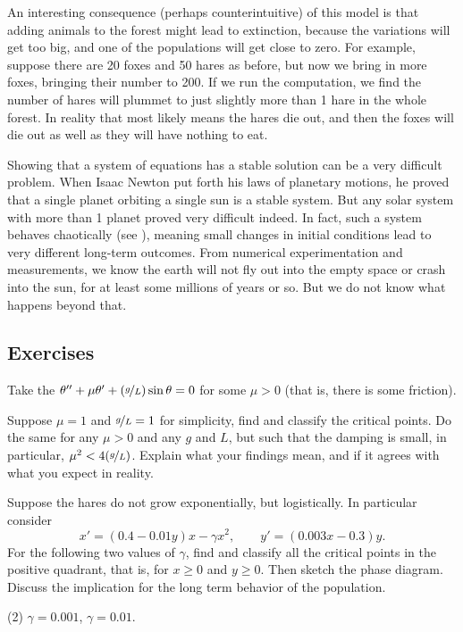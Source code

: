 An interesting consequence (perhaps counterintuitive) of this model is that adding animals to
the forest might lead to extinction, because the variations will get too
big, and one of the populations will get close to zero.  For example, suppose there are 20 foxes and 50 hares as
before, but now we bring in more foxes, bringing their number to 200.  If we
run the computation, we find the number of hares will plummet to just
slightly more than 1 hare in the whole forest.  In reality that most
likely means the hares die out, and then the foxes will die out as well
as they will have nothing to eat.

Showing that a system of equations has a stable solution can be a very
difficult problem.  When Isaac Newton put forth his laws of
planetary motions, he proved that a single planet orbiting a single sun is a
stable system.  But any solar system with more than 1 planet proved very
difficult indeed.  In fact, such a system behaves chaotically (see 
), meaning small changes in initial conditions lead to very
different long-term outcomes.  From numerical experimentation and
measurements, we know the earth will not fly out into the empty space
or crash into the sun, for at least some millions of years or so.
But we do not know what happens beyond that.

\subsection{Exercises}

\begin{exercise}
Take the \emph{} $\theta '' + \mu \theta' +
(\nicefrac{g}{L})
\sin \theta = 0$ for some $\mu > 0$ (that is, there is some friction).
\begin{tasks}
\task
Suppose $\mu = 1$ and $\nicefrac{g}{L} = 1$ for simplicity, find and
classify the critical points.
\task
Do the same for any $\mu > 0$ and any $g$
and $L$, but such that the damping is small, in particular, $\mu^2 <
4(\nicefrac{g}{L})$.
\task
Explain what your findings mean, and if it agrees with what you
expect in reality.
\end{tasks}
\end{exercise}

\begin{exercise}
Suppose the hares do not grow exponentially, but logistically.  In
particular consider
\begin{equation*}
x' = (0.4-0.01y)x - \gamma x^2, \qquad y' = (0.003x-0.3)y .
\end{equation*}
For the following two values of $\gamma$,
find and classify all the critical points in the positive quadrant, that is, for
$x \geq 0$ and $y \geq 0$.  Then sketch the phase diagram.  Discuss the
implication for the long term behavior of the population.
\begin{tasks}(2)
\task
$\gamma=0.001$, 
\task
$\gamma=0.01$.
\end{tasks}
\end{exercise}

